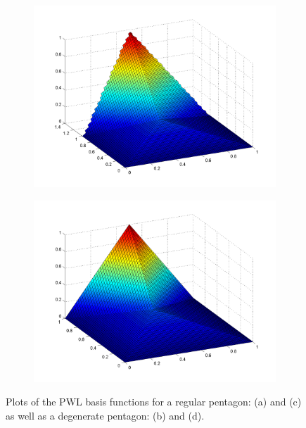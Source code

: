 \begin{figure}
\begin{subfigure}[b]{0.48\textwidth}
		\includegraphics[width=\textwidth]{figures/sec_BF/PWL_rpent_plot_E.png}
		\caption{}
	\end{subfigure}
	\hfill
	\begin{subfigure}[b]{0.48\textwidth}
		\centering
		\includegraphics[width=\textwidth]{figures/sec_BF/PWL_dpent_plot_E.png}
		\caption{}
	\end{subfigure}
\caption{Plots of the PWL basis functions for a regular pentagon: (a) and (c) as well as a degenerate pentagon: (b) and (d).}
\end{figure}

